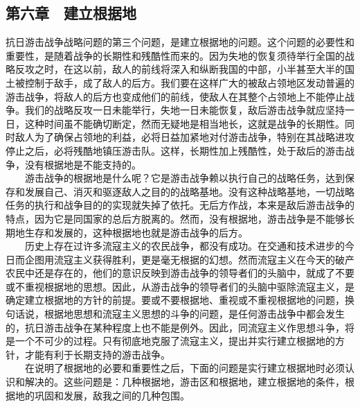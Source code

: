 \documentclass[cn,11pt,chinese]{elegantbook}
\def\myformat#1{\hfil\hfil #1}
\begin{document}
\subsection*{\myformat{第六章　建立根据地}}
抗日游击战争战略问题的第三个问题，是建立根据地的问题。这个问题的必要性和重要性，是随着战争的长期性和残酷性而来的。因为失地的恢复须待举行全国的战略反攻之时，在这以前，敌人的前线将深入和纵断我国的中部，小半甚至大半的国土被控制于敌手，成了敌人的后方。我们要在这样广大的被敌占领地区发动普遍的游击战争，将敌人的后方也变成他们的前线，使敌人在其整个占领地上不能停止战争。我们的战略反攻一日未能举行，失地一日未能恢复，敌后游击战争就应坚持一日，这种时间虽不能确切断定，然而无疑地是相当地长，这就是战争的长期性。同时敌人为了确保占领地的利益，必将日益加紧地对付游击战争，特别在其战略进攻停止之后，必将残酷地镇压游击队。这样，长期性加上残酷性，处于敌后的游击战争，没有根据地是不能支持的。\\
　　游击战争的根据地是什么呢？它是游击战争赖以执行自己的战略任务，达到保存和发展自己、消灭和驱逐敌人之目的的战略基地。没有这种战略基地，一切战略任务的执行和战争目的的实现就失掉了依托。无后方作战，本来是敌后游击战争的特点，因为它是同国家的总后方脱离的。然而，没有根据地，游击战争是不能够长期地生存和发展的，这种根据地也就是游击战争的后方。\\
　　历史上存在过许多流寇主义的农民战争，都没有成功。在交通和技术进步的今日而企图用流寇主义获得胜利，更是毫无根据的幻想。然而流寇主义在今天的破产农民中还是存在的，他们的意识反映到游击战争的领导者们的头脑中，就成了不要或不重视根据地的思想。因此，从游击战争的领导者们的头脑中驱除流寇主义，是确定建立根据地的方针的前提。要或不要根据地、重视或不重视根据地的问题，换句话说，根据地思想和流寇主义思想的斗争的问题，是任何游击战争中都会发生的，抗日游击战争在某种程度上也不能是例外。因此，同流寇主义作思想斗争，将是一个不可少的过程。只有彻底地克服了流寇主义，提出并实行建立根据地的方针，才能有利于长期支持的游击战争。\\
　　在说明了根据地的必要和重要性之后，下面的问题是实行建立根据地时必须认识和解决的。这些问题是：几种根据地，游击区和根据地，建立根据地的条件，根据地的巩固和发展，敌我之间的几种包围。\\
\end{document}
